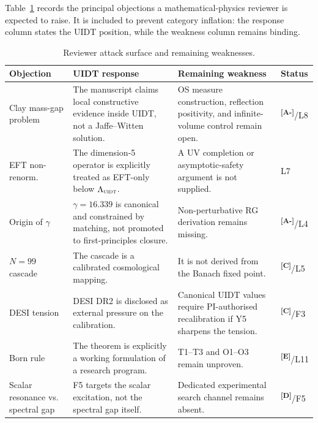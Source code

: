 \documentclass[12pt,a4paper,twoside]{article}
\theoremstyle{plain}
\theoremstyle{definition}
\theoremstyle{remark}
\newcommand{\UIDT}{\textsc{uidt}}
\newcommand{\catmark}[1]{\textsuperscript{\textsf{\textbf{[#1]}}}}
\newcommand{\GammaGeom}{16.339}                     %
\begin{document}
Table~\ref{tab:reviewer_attack_surface} records the principal objections a
mathematical-physics reviewer is expected to raise. It is included to prevent
category inflation: the response column states the UIDT position, while the
weakness column remains binding.

\begin{table}[H]
\centering
\footnotesize
\caption{Reviewer attack surface and remaining weaknesses.}
\label{tab:reviewer_attack_surface}
{\setlength{\tabcolsep}{3pt}%
\renewcommand{\arraystretch}{1.12}%
\begin{tabular}{@{}>{\raggedright\arraybackslash}p{2.8cm}
                >{\raggedright\arraybackslash}p{4.7cm}
                >{\raggedright\arraybackslash}p{4.6cm}
                >{\raggedright\arraybackslash}p{1.6cm}@{}}
\toprule
\textbf{Objection} & \textbf{UIDT response} & \textbf{Remaining weakness} &
\textbf{Status} \\
\midrule
Clay mass-gap problem & The manuscript claims local constructive evidence
inside UIDT, not a Jaffe--Witten solution. & OS measure construction,
reflection positivity, and infinite-volume control remain open. & \catmark{A-}/L8 \\
\midrule
EFT non-renorm. & The dimension-5 operator is explicitly treated as
EFT-only below $\Lambda_{\UIDT}$. & A UV completion or asymptotic-safety
argument is not supplied. & L7 \\
\midrule
Origin of $\gamma$ & $\gamma=\GammaGeom$ is canonical and constrained by
matching, not promoted to first-principles closure. & Non-perturbative RG
derivation remains missing. & \catmark{A-}/L4 \\
\midrule
$N=99$ cascade & The cascade is a calibrated cosmological mapping. & It is
not derived from the Banach fixed point. & \catmark{C}/L5 \\
\midrule
DESI tension & DESI DR2 is disclosed as external pressure on the calibration. &
Canonical UIDT values require PI-authorised recalibration if Y5 sharpens the
tension. & \catmark{C}/F3 \\
\midrule
Born rule & The theorem is explicitly a working formulation of a research
program. & T1--T3 and O1--O3 remain unproven. & \catmark{E}/L11 \\
\midrule
Scalar resonance vs. spectral gap & F5 targets the scalar excitation, not the
spectral gap itself. & Dedicated experimental search channel remains absent. &
\catmark{D}/F5 \\
\bottomrule
\end{tabular}
}
\end{table}
\end{document}
